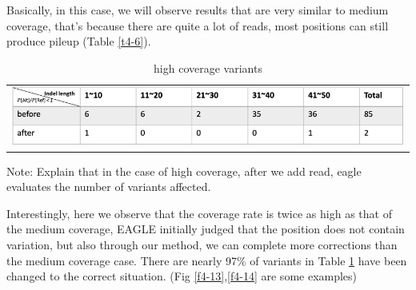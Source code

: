 Basically, in this case, we will observe results that are very similar to medium coverage, that's because there are quite a lot of reads, most positions can still produce pileup (Table \ref{t4-6}).

\vspace{1cm}
\begin{table}[h]
    \centering
    \caption[high coverage variants]{high coverage variants}
    \vspace{-0.5cm}
    \begin{tabular}{c}
        \includegraphics[width=1\textwidth]{body/image/t4-7.png}
    \end{tabular}
    \label{t4-7}
    
    {Note: Explain that in the case of high coverage, after we add read, eagle evaluates the number of variants affected.}
\end{table}

Interestingly, here we observe that the coverage rate is twice as high as that of the medium coverage, EAGLE initially judged that the position does not contain variation, but also through our method, we can complete more corrections than the medium coverage case. There are nearly 97\% of variants in Table \ref{t4-7} have been changed to the correct situation. (Fig \ref{f4-13},\ref{f4-14} are some examples)


